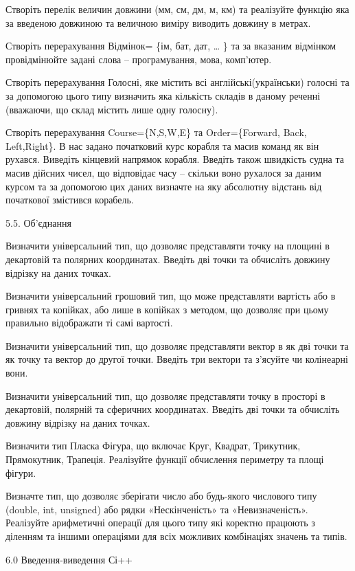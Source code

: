 \documentclass[]{article}
\begin{document}
\protect\hypertarget{_Hlk48906187}{}{}Створіть перелік величин довжини
(мм, см, дм, м, км) та реалізуйте функцію яка за введеною довжиною та
величною виміру виводить довжину в метрах.

Створіть перерахування Відмінок= \{ім, бат, дат, \ldots{} \} та за
вказаним відмінком провідмінюйте задані слова -- програмування, мова,
комп'ютер.

Створіть перерахування Голосні, яке містить всі англійські(українськи)
голосні та за допомогою цього типу визначить яка кількість складів в
даному реченні (вважаючи, що склад містить лише одну голосну).

Створіть перерахування Course=\{N,S,W,E\} та Order=\{Forward, Back,
Left,Right\}. В нас задано початковий курс корабля та масив команд як
він рухався. Виведіть кінцевий напрямок корабля. Введіть також швидкість
судна та масив дійсних чисел, що відповідає часу -- скільки воно
рухалося за даним курсом та за допомогою цих даних визначте на яку
абсолютну відстань від початкової змістився корабель.

5.5. Об'єднання

Визначити універсальний тип, що дозволяє представляти точку на площині в
декартовій та полярних координатах. Введіть дві точки та обчисліть
довжину відрізку на даних точках.

Визначити універсальний грошовий тип, що може представляти вартість або
в гривнях та копійках, або лише в копійках з методом, що дозволяє при
цьому правильно відображати ті самі вартості.

Визначити універсальний тип, що дозволяє представляти вектор в як дві
точки та як точку та вектор до другої точки. Введіть три вектори та
з'ясуйте чи колінеарні вони.

Визначити універсальний тип, що дозволяє представляти точку в просторі в
декартовій, полярній та сферичних координатах. Введіть дві точки та
обчисліть довжину відрізку на даних точках.

Визначити тип Пласка Фігура, що включає Круг, Квадрат, Трикутник,
Прямокутник, Трапеція. Реалізуйте функції обчислення периметру та площі
фігури.

Визначте тип, що дозволяє зберігати число або будь-якого числового типу
(double, int, unsigned) або рядки «Нескінченість» та «Невизначеність».
Реалізуйте арифметичні операції для цього типу які коректно працюють з
діленням та іншими операціями для всіх можливих комбінаціях значень та
типів.

6.0 Введення-виведення Сі++
\end{document}
